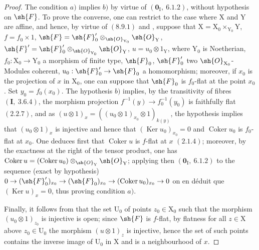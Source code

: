\begin{proof}
The condition $a)$ implies $b)$ by virtue of $(\mathbf{0}_\mathrm{I},~6.1.2)$, without hypothesis on $\sh{F}$. To prove the converse, one can restrict to the case where $\mathrm{X}$ and $\mathrm{Y}$ are affine, and hence, by virtue of $(8.9.1)$ and , suppose that $\mathrm{X}=\mathrm{X}_0\times_{\mathrm{Y}_0}\mathrm{Y}$, $f=f_0\times 1$, $\sh{F}=\sh{F}'_0\otimes_{\sh{O}_{\mathrm{Y}_0}}\sh{O}_\mathrm{Y}$, $\sh{F}'=\sh{F}'_0\otimes_{\sh{O}_{\mathrm{Y}_0}}\sh{O}_\mathrm{Y}$, $u=u_0\otimes 1_\mathrm{Y}$, where $\mathrm{Y}_0$ is Noetherian, $f_0:\mathrm{X}_0\to\mathrm{Y}_0$ a morphism of finite type, $\sh{F}_0$, $\sh{F}'_0$ two $\sh{O}_{\mathrm{X}_0}$-Modules coherent, $u_0:\sh{F}'_0\to\sh{F}_0$ a homomorphism; moreover, if $x_0$ is the projection of $x$ in $\mathrm{X}_0$, one can suppose that $\sh{F}_0$ is $f_0$-flat at the point $x_0$. Set $y_0=f_0(x_0)$. The hypothesis $b)$ implies, by the transitivity of fibres $(\mathbf{I},~3.6.4)$, the morphism projection $f^{-1}(y)\to f_0^{-1}(y_0)$ is faithfully flat $(2.2.7)$, and as $(u\otimes 1)_x=((u_0\otimes 1)_{x_0}\otimes 1)_{k(y)}$, the hypothesis implies that $(u_0\otimes 1)_x$ is injective and hence that $(\operatorname{Ker} u_0)_{x_0}=0$ and $\operatorname{Coker} u_0$ is $f_0$-flat at $x_0$. One deduces first that $\operatorname{Coker} u$ is $f$-flat at $x$ $(2.1.4)$; moreover, by the exactness at the right of the tensor product, one has $\operatorname{Coker} u=(\operatorname{Coker} u_0)\otimes_{\sh{O}_\mathrm{Y}}\sh{O}_\mathrm{Y}$; applying then $(\mathbf{0}_\mathrm{I},~6.1.2)$ to the sequence (exact by hypothesis) $0\to(\sh{F}'_0)_{x_0}\to(\sh{F}_0)_{x_0}\to(\operatorname{Coker} u_0)_{x_0}\to 0$ on en d\'{e}duit que $(\operatorname{Ker} u)_x=0$, thus proving condition $a)$.

Finally, it follows from  that the set $\mathrm{U}_0$ of points $z_0\in\mathrm{X}_0$ such that the morphism $(u_0\otimes 1)_{z_0}$ is injective is open; since $\sh{F}$ is $f$-flat, by flatness for all $z\in\mathrm{X}$ above $z_0\in\mathrm{U}_0$ the morphism $(u\otimes 1)_z$ is injective, hence the set of such points contains the inverse image of $\mathrm{U}_0$ in $\mathrm{X}$ and is a neighbourhood of $x$.
\end{proof}

